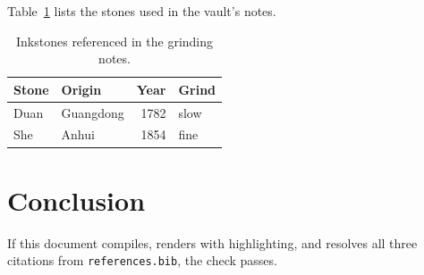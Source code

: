 \documentclass[11pt]{article}
\begin{document}
Table~\ref{tab:stones} lists the stones used in the vault's notes.

\begin{table}[h]
  \centering
  \begin{tabular}{llrl}
    \toprule
    Stone & Origin    & Year & Grind \\
    \midrule
    Duan  & Guangdong & 1782 & slow  \\
    She   & Anhui     & 1854 & fine  \\
    \bottomrule
  \end{tabular}
  \caption{Inkstones referenced in the grinding notes.}
  \label{tab:stones}
\end{table}

\section{Conclusion}

If this document compiles, renders with highlighting, and resolves all
three citations from \texttt{references.bib}, the check passes.



\end{document}
